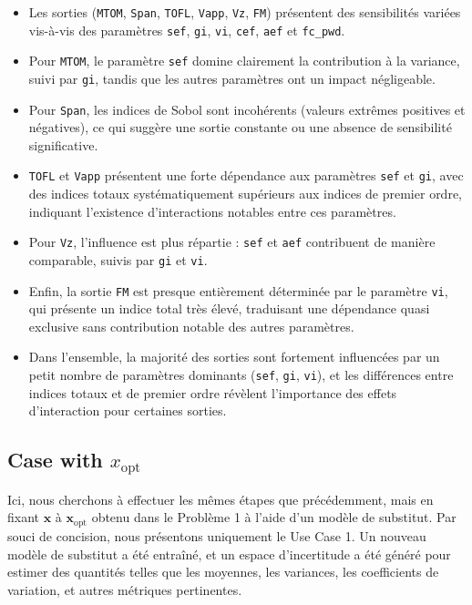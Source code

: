\documentclass[a4paper, 11pt]{article}
\begin{document}
\begin{itemize}
    \item Les sorties (\texttt{MTOM}, \texttt{Span}, \texttt{TOFL}, \texttt{Vapp}, \texttt{Vz}, \texttt{FM}) présentent des sensibilités variées vis-à-vis des paramètres \texttt{sef}, \texttt{gi}, \texttt{vi}, \texttt{cef}, \texttt{aef} et \texttt{fc\_pwd}.
    \item Pour \texttt{MTOM}, le paramètre \texttt{sef} domine clairement la contribution à la variance, suivi par \texttt{gi}, tandis que les autres paramètres ont un impact négligeable.
    \item Pour \texttt{Span}, les indices de Sobol sont incohérents (valeurs extrêmes positives et négatives), ce qui suggère une sortie constante ou une absence de sensibilité significative.
    \item \texttt{TOFL} et \texttt{Vapp} présentent une forte dépendance aux paramètres \texttt{sef} et \texttt{gi}, avec des indices totaux systématiquement supérieurs aux indices de premier ordre, indiquant l'existence d'interactions notables entre ces paramètres.
    \item Pour \texttt{Vz}, l’influence est plus répartie : \texttt{sef} et \texttt{aef} contribuent de manière comparable, suivis par \texttt{gi} et \texttt{vi}.
    \item Enfin, la sortie \texttt{FM} est presque entièrement déterminée par le paramètre \texttt{vi}, qui présente un indice total très élevé, traduisant une dépendance quasi exclusive sans contribution notable des autres paramètres.
    \item Dans l’ensemble, la majorité des sorties sont fortement influencées par un petit nombre de paramètres dominants (\texttt{sef}, \texttt{gi}, \texttt{vi}), et les différences entre indices totaux et de premier ordre révèlent l’importance des effets d’interaction pour certaines sorties.
\end{itemize}

\subsection{Case with $x_{\text{opt}}$}

Ici, nous cherchons à effectuer les mêmes étapes que précédemment, mais en fixant \( \mathbf{x} \) à \( \mathbf{x}_{\text{opt}} \) obtenu dans le Problème 1 à l'aide d'un modèle de substitut. Par souci de concision, nous présentons uniquement le Use Case 1. Un nouveau modèle de substitut a été entraîné, et un espace d'incertitude a été généré pour estimer des quantités telles que les moyennes, les variances, les coefficients de variation, et autres métriques pertinentes.
\end{document}

